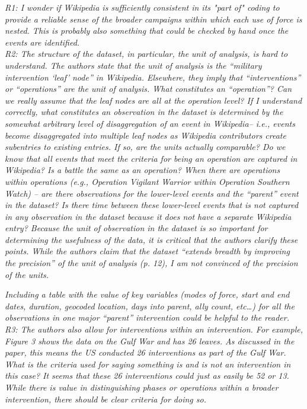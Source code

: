 \documentclass[fleqn,12pt]{article}
\begin{document}
\noindent
\textit{R1: I wonder if Wikipedia is sufficiently consistent in its "part of" coding to provide a reliable sense of the broader campaigns within which each use of force is nested. This is probably also something that could be checked by hand once the events are identified.} \\

\noindent
\textit{R2: The structure of the dataset, in particular, the unit of analysis, is hard to understand. The authors state that the unit of analysis is the “military intervention ‘leaf’ node” in Wikipedia. Elsewhere, they imply that “interventions” or “operations” are the unit of analysis. What constitutes an “operation”? Can we really assume that the leaf nodes are all at the operation level? If I understand correctly, what constitutes an observation in the dataset is determined by the somewhat arbitrary level of disaggregation of an event in Wikipedia– i.e., events become disaggregated into multiple leaf nodes as Wikipedia contributors create subentries to existing entries. If so, are the units actually comparable? Do we know that all events that meet the criteria for being an operation are captured in Wikipedia? Is a battle the same as an operation?   When there are operations within operations (e.g., Operation Vigilant Warrior within Operation Southern Watch) – are there observations for the lower-level events and the “parent” event in the dataset? Is there time between these lower-level events that is not captured in any observation in the dataset because it does not have a separate Wikipedia entry? Because the unit of observation in the dataset is so important for determining the usefulness of the data, it is critical that the authors clarify these points. While the authors claim that the dataset “extends breadth by improving the precision” of the unit of analysis (p. 12), I am not convinced of the precision of the units.}

\textit{Including a table with the value of key variables (modes of force, start and end dates, duration, geocoded location, days into parent, ally count, etc…) for all the observations in one major “parent” intervention could be helpful to the reader.} \\

\noindent
\textit{R3: The authors also allow for interventions within an intervention. For example, Figure 3 shows the data on the Gulf War and has 26 leaves. As discussed in the paper, this means the US conducted 26 interventions as part of the Gulf War. What is the criteria used for saying something is and is not an intervention in this case? It seems that these 26 interventions could just as easily be 52 or 13. While there is value in distinguishing phases or operations within a broader intervention, there should be clear criteria for doing so.} \\
\end{document}
